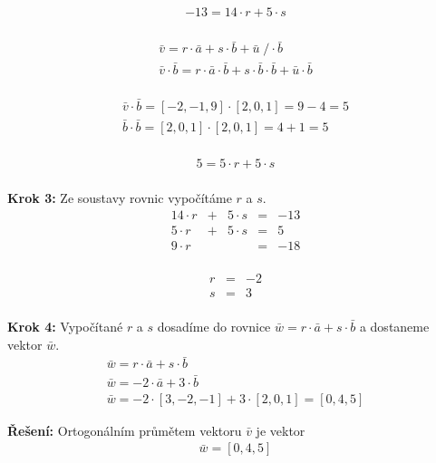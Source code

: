\begin{displaymath}
\begin{matrix}
-13=14\cdot r+5\cdot s\\
\end{matrix}
\end{displaymath}

\begin{displaymath}
\begin{matrix}
\bar{v} = r\cdot\bar{a}+s\cdot\bar{b} + \bar{u} \; / \cdot \bar{b}\\
\bar{v}\cdot\bar{b} = r\cdot\bar{a}\cdot\bar{b} + s\cdot\bar{b}\cdot\bar{b} + \bar{u}\cdot\bar{b}\\
\end{matrix}
\end{displaymath}

\begin{displaymath}
\begin{matrix}
\bar{v}\cdot\bar{b} = [\minus2,\minus1,9]\cdot[2,0,1]=9\minus4=5\\
\bar{b}\cdot\bar{b} = [2,0,1]\cdot[2,0,1]=4+1=5\\
\end{matrix}
\end{displaymath}

\begin{displaymath}
\begin{matrix}
5=5\cdot r+5\cdot s\\
\end{matrix}
\end{displaymath}

\textbf{Krok 3:} Ze soustavy rovnic vypočítáme $r$ a $s$.
\begin{displaymath}
\begin{matrix}
14\cdot r & + & 5\cdot s & = & -13\\
5\cdot r & + & 5\cdot s & = & 5 \\
\hline
9\cdot r & & & = & -18\\
\end{matrix}
\end{displaymath}

\begin{displaymath}
\begin{matrix}
r & = & -2\\
s & = & 3\\
\end{matrix}
\end{displaymath}

\textbf{Krok 4:} Vypočítané $r$ a $s$ dosadíme do rovnice $\bar{w} = r\cdot\bar{a}+s\cdot\bar{b}$ a dostaneme vektor $\bar{w}$.
\begin{displaymath}
\begin{matrix}
\bar{w} = r\cdot\bar{a}+s\cdot\bar{b} \\ 
\bar{w} = -2\cdot\bar{a} +  3\cdot\bar{b} \\
\bar{w} = -2\cdot[3,\minus2,\minus1] +  3\cdot[2,0,1] = [0,4,5]
\end{matrix}
\end{displaymath}

\textbf{Řešení:} Ortogonálním průmětem vektoru $\bar{v}$ je vektor
\begin{displaymath}
\begin{matrix}
\bar{w} = [0,4,5]
\end{matrix}
\end{displaymath}